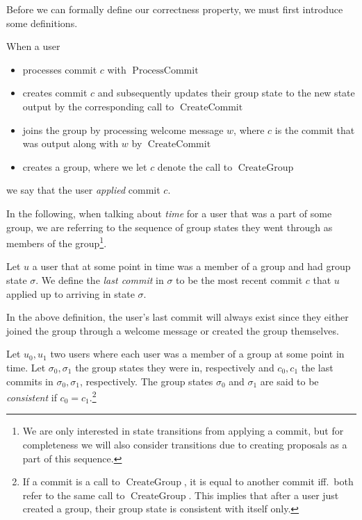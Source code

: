 Before we can formally define our correctness property, we must first introduce some definitions.

\begin{definition}
	When a user
	\begin{itemize}
		\item processes commit $c$ with $\operatorname{ProcessCommit}$
		\item creates commit $c$ and subsequently updates their group state to the new state output by the corresponding call to $\operatorname{CreateCommit}$
		\item joins the group by processing welcome message $w$, where $c$ is the commit that was output along with $w$ by $\operatorname{CreateCommit}$
		\item creates a group, where we let $c$ denote the call to $\operatorname{CreateGroup}$
	\end{itemize}
	we say that the user \emph{applied} commit $c$.
\end{definition}

In the following, when talking about \emph{time} for a user that was a part of some group, we are referring to the sequence of group states they went through as members of the group\footnote{We are only interested in state transitions from applying a commit, but for completeness we will also consider transitions due to creating proposals as a part of this sequence.}.

\begin{definition}
	Let $u$ a user that at some point in time was a member of a group and had group state $\sigma$. We define the \emph{last commit} in $\sigma$ to be the most recent commit $c$ that $u$ applied up to arriving in state $\sigma$.
\end{definition}

In the above definition, the user's last commit will always exist since they either joined the group through a welcome message or created the group themselves.

\begin{definition} \label{def:consistent-group-state}
	Let $u_0, u_1$ two users where each user was a member of a group at some point in time. Let $\sigma_0, \sigma_1$ the group states they were in, respectively and $c_0, c_1$ the last commits in $\sigma_0, \sigma_1$, respectively. The group states $\sigma_0$ and $\sigma_1$ are said to be \emph{consistent} if $c_0 = c_1$.\footnote{If a commit is a call to $\operatorname{CreateGroup}$, it is equal to another commit iff.\ both refer to the same call to $\operatorname{CreateGroup}$. This implies that after a user just created a group, their group state is consistent with itself only.}
\end{definition}

